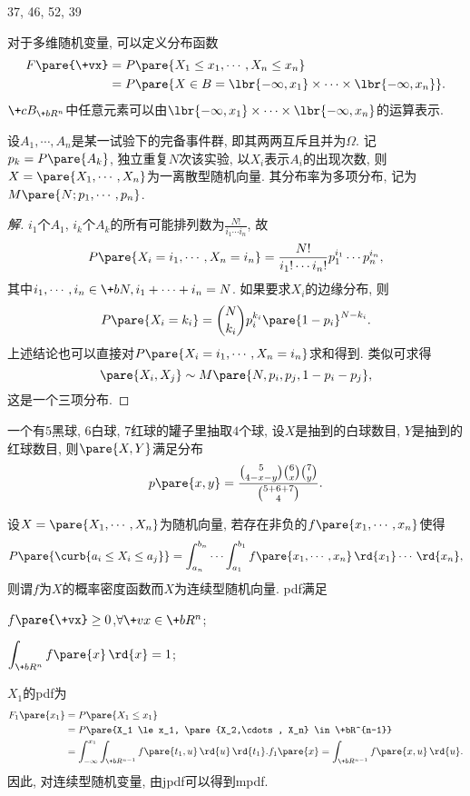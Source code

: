 \documentclass[../Statistics.tex]{subfiles}
\begin{document}
37, 46, 52, 39


\par
对于多维随机变量, 可以定义分布函数
\begin{align*}
    F\pare{\+vx} &= P\pare{X_1 \le x_1, \cdots, X_n \le x_n}\\ &= P\pare{X\in B = \lbr{-\infty,x_1}\times\cdots\times\lbr{-\infty, x_n}}. 
\end{align*}
$\+cB_{\+bR^n}$中任意元素可以由$\lbr{-\infty,x_1}\times\cdots\times\lbr{-\infty, x_n}$的运算表示.
\begin{sample}
    \begin{ex}
        设$A_1,\cdots,A_n$是某一试验下的完备事件群, 即其两两互斥且并为$\Omega$. 记$p_k=P\pare{A_k}$, 独立重复$N$次该实验, 以$X_i$表示$A_i$的出现次数, 则$X=\pare{X_1,\cdots,X_n}$为一离散型随机向量. 其分布率为多项分布, 记为$M\pare{N;p_1,\cdots,p_n}$.
    \end{ex}
    \begin{proof}[解]
        $i_1$个$A_1$, $i_k$个$A_k$的所有可能排列数为$\displaystyle \frac{N!}{i_1 \cdots i_n}$, 故
        \[ P\pare{X_i = i_1, \cdots, X_n = i_n} = \frac{N!}{i_1!\cdots i_n!} p_1^{i_1}\cdots p_n^{i_n}, \]
        其中$i_1,\cdots,i_n\in \+bN, i_1 + \cdots + i_n = N$. 如果要求$X_i$的边缘分布, 则
        \[ P\pare{X_i = k_i} = \binom{N}{k_i} p_i^{k_i}\pare{1-p_i}^{N-k_i}. \]
        上述结论也可以直接对$P\pare{X_i = i_1, \cdots, X_n = i_n}$求和得到. 类似可求得
        \[ \pare{X_i, X_j} \sim M\pare{N,p_i, p_j, 1-p_i-p_j}, \]
        这是一个三项分布.
    \end{proof}
\end{sample}
\begin{sample}
    \begin{ex}
        一个有$5$黑球, $6$白球, $7$红球的罐子里抽取$4$个球, 设$X$是抽到的白球数目, $Y$是抽到的红球数目, 则$\pare{X,Y}$满足分布
        \[ p\pare{x,y} = \frac{\binom{5}{4-x-y}\binom{6}{x}\binom{7}{y}}{\binom{5+6+7}{4}}. \]
    \end{ex}
\end{sample}
设$X=\pare{X_1,\cdots,X_n}$为随机向量, 若存在非负的$f\pare{x_1,\cdots,x_n}$使得
\[ P\pare{\curb{a_i \le X_i \le a_j}} = \int_{a_n}^{b_n}\cdots \int_{a_1}^{b_1} f\pare{x_1,\cdots,x_n}\,\rd{x_1}\cdots\,\rd{x_n}, \]
则谓$f$为$X$的概率密度函数而$X$为连续型随机向量. pdf满足
\begin{cenum}
    \item $f\pare{\+vx} \ge 0$,\quad $\forall \+vx \in \+bR^n$;
    \item $\displaystyle \int_{\+bR^n} f\pare{x}\,\rd{x} = 1$;
    \item $X_1$的pdf为
    \begin{align*}
        F_1\pare{x_1} &= P\pare{X_1 \le x_1} \\
        &= P\pare{X_1 \le x_1, \pare{X_2,\cdots, X_n} \in \+bR^{n-1}} \\
        &= \int_{-\infty}^{x_1}\int_{\+bR^{n-1}} f\pare{t_1,u}\,\rd{u}\,\rd{t_1}.
        f_1\pare{x} = \int_{\+bR^{n-1}} f\pare{x,u}\,\rd{u}.
    \end{align*}
    因此, 对连续型随机变量, 由jpdf可以得到mpdf.
\end{cenum}
\end{document}
